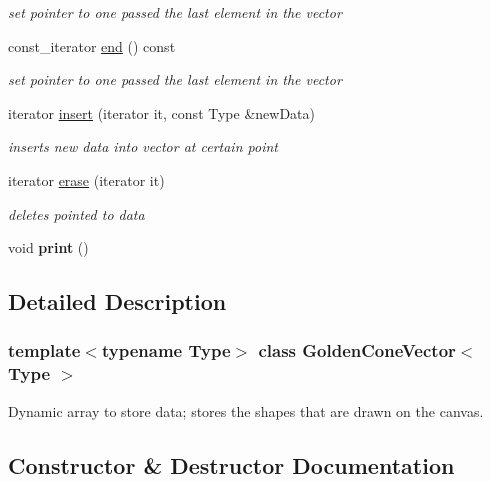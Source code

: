 \begin{DoxyCompactItemize}
\begin{DoxyCompactList}\small\item\em set pointer to one passed the last element in the vector \end{DoxyCompactList}\item 
const\+\_\+iterator \mbox{\hyperlink{class_golden_cone_vector_a7962ba599356afbbfc2e21ac58fceb2b}{end}} () const
\begin{DoxyCompactList}\small\item\em set pointer to one passed the last element in the vector \end{DoxyCompactList}\item 
iterator \mbox{\hyperlink{class_golden_cone_vector_a88d8c250877cea1bbec12ec6419a32d8}{insert}} (iterator it, const Type \&new\+Data)
\begin{DoxyCompactList}\small\item\em inserts new data into vector at certain point \end{DoxyCompactList}\item 
iterator \mbox{\hyperlink{class_golden_cone_vector_a27534fb2287d04adae0d1e92aef8f062}{erase}} (iterator it)
\begin{DoxyCompactList}\small\item\em deletes pointed to data \end{DoxyCompactList}\item 
\mbox{\label{class_golden_cone_vector_af98335cbce7c8680a3e45e5095443974}} 
void {\bfseries print} ()
\end{DoxyCompactItemize}


\subsection{Detailed Description}
\subsubsection*{template$<$typename Type$>$\newline
class Golden\+Cone\+Vector$<$ Type $>$}

Dynamic array to store data; stores the shapes that are drawn on the canvas. 

\subsection{Constructor \& Destructor Documentation}
\mbox{\label{class_golden_cone_vector_a71f4b758ace85746a4ad04625191e475}} 

